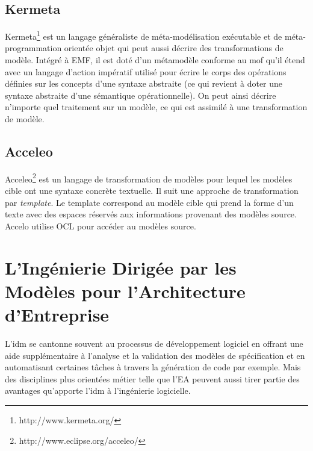 \subsection{Kermeta}
Kermeta\footnote{http://www.kermeta.org/} est un langage généraliste de méta-modélisation exécutable et de 
méta-programmation orientée objet qui peut aussi décrire des transformations de 
modèle. Intégré à EMF, il est doté d'un métamodèle conforme au \gls{mof} qu'il étend 
avec un langage d'action impératif utilisé pour écrire le corps des opérations 
définies sur les concepts d'une syntaxe abstraite (ce qui revient à doter une 
syntaxe abstraite d'une sémantique opérationnelle). On peut ainsi décrire 
n'importe quel traitement sur un modèle, ce qui est assimilé à une transformation 
de modèle.


\subsection{Acceleo}
Acceleo\footnote{http://www.eclipse.org/acceleo/} est un langage de transformation de modèles pour lequel les modèles cible ont une syntaxe concrète textuelle. Il suit une approche de transformation par \textit{template}. Le template correspond au modèle cible qui prend la forme d'un texte avec des espaces réservés aux informations provenant des modèles source. Accelo utilise OCL pour accéder au modèles source.  

\section{L'Ingénierie Dirigée par les Modèles pour l'Architecture d'Entreprise}

L'\gls{idm} se cantonne souvent au processus de développement logiciel en offrant une aide supplémentaire à l'analyse et la validation des modèles de spécification et en automatisant certaines tâches à travers la génération de code par exemple. Mais des disciplines plus orientées métier telle que l'EA peuvent aussi tirer partie des avantages qu'apporte l'\gls{idm} à l'ingénierie logicielle. 

